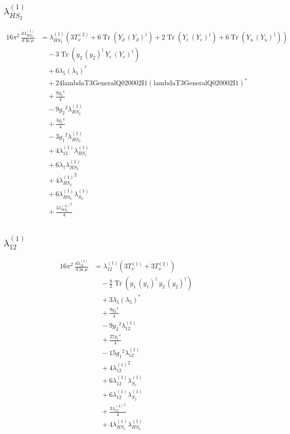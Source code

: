 \documentclass[10pt,a4paper]{article}
\begin{document}
\subsection*{$\lambda_{HS_2}^{(1)}$}
\begin{align*}
16\pi^2\,\frac{d \lambda_{HS_2}^{(1)}}{d\ln\mu} &={\lambda_{HS_2}^{(1)}} (3 T_{\nu}^{(2)}+6 \operatorname{Tr}\!\left({Y_d}\,\left({Y_d}\right)^{\dagger}\right)+2 \operatorname{Tr}\!\left({Y_e}\,\left({Y_e}\right)^{\dagger}\right)+6 \operatorname{Tr}\!\left({Y_u}\,\left({Y_u}\right)^{\dagger}\right)) \\
&\quad -3 \operatorname{Tr}\!\left({y_2}\,\left({y_2}\right)^{\dagger}\,{Y_e}\,\left({Y_e}\right)^{\dagger}\right) \\
&\quad +6 {\lambda_5} \left({\lambda_5}\right)^{*} \\
&\quad +24 \text{lambdaT3GeneralQ020002I1} \left(\text{lambdaT3GeneralQ020002I1}\right)^{*} \\
&\quad +\frac{9 {g_2}^4}{4} \\
&\quad -9 {g_2}^2 {\lambda_{HS_2}^{(1)}} \\
&\quad +\frac{3 {g_1}^4}{4} \\
&\quad -3 {g_1}^2 {\lambda_{HS_2}^{(1)}} \\
&\quad +4 {\lambda_{12}^{(1)}} {\lambda_{HS_1}^{(1)}} \\
&\quad +6 {\lambda_1} {\lambda_{HS_2}^{(1)}} \\
&\quad +4 {\lambda_{HS_2}^{(1)}}^2 \\
&\quad +6 {\lambda_{HS_2}^{(1)}} {\lambda_{S_2}^{(1)}} \\
&\quad +\frac{3 {\lambda_{HS_2}^{(A)}}^2}{4} \\
\end{align*}
\subsection*{$\lambda_{12}^{(1)}$}
\begin{align*}
16\pi^2\,\frac{d \lambda_{12}^{(1)}}{d\ln\mu} &={\lambda_{12}^{(1)}} (3 T_{\nu}^{(1)}+3 T_{\nu}^{(2)}) \\
&\quad -\frac{9}{2} \operatorname{Tr}\!\left({y_1}\,\left({y_1}\right)^{\dagger}\,{y_2}\,\left({y_2}\right)^{\dagger}\right) \\
&\quad +3 {\lambda_5} \left({\lambda_5}\right)^{*} \\
&\quad +\frac{9 {g_2}^4}{4} \\
&\quad -9 {g_2}^2 {\lambda_{12}^{(1)}} \\
&\quad +\frac{27 {g_1}^4}{4} \\
&\quad -15 {g_1}^2 {\lambda_{12}^{(1)}} \\
&\quad +4 {\lambda_{12}^{(1)}}^2 \\
&\quad +6 {\lambda_{12}^{(1)}} {\lambda_{S_1}^{(1)}} \\
&\quad +6 {\lambda_{12}^{(1)}} {\lambda_{S_2}^{(1)}} \\
&\quad +\frac{3 {\lambda_{12}^{(A)}}^2}{4} \\
&\quad +4 {\lambda_{HS_1}^{(1)}} {\lambda_{HS_2}^{(1)}} \\
\end{align*}
\end{document}
